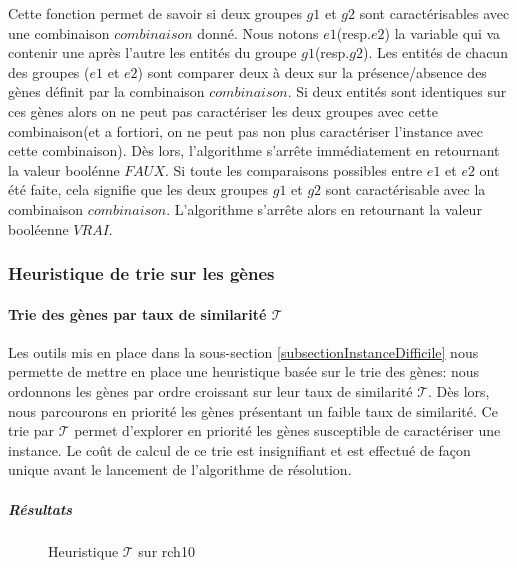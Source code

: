 Cette fonction permet de savoir si deux groupes $g1$ et $g2$ sont caractérisables avec une combinaison $combinaison$ donné. Nous notons $e1$(resp.$e2$) la variable qui va contenir une après l'autre les entités du groupe $g1$(resp.$g2$). Les entités de chacun des groupes ($e1$ et $e2$) sont comparer deux à deux sur la présence/absence des gènes définit par la combinaison $combinaison$. Si deux entités sont identiques sur ces gènes alors on ne peut pas caractériser les deux groupes avec cette combinaison(et a fortiori, on ne peut pas non plus caractériser l'instance avec cette combinaison). Dès lors, l'algorithme s'arrête immédiatement en retournant la valeur boolénne $FAUX$. Si toute les comparaisons possibles entre $e1$ et $e2$ ont été faite, cela signifie que les deux groupes $g1$ et $g2$ sont caractérisable avec la combinaison $combinaison$. L'algorithme s'arrête alors en retournant la valeur booléenne $VRAI$.



\subsubsection{Heuristique de trie sur les gènes }
\paragraph{Trie des gènes par taux de similarité $\mathcal{T}$}
Les outils mis en place dans la sous-section \ref{subsectionInstanceDifficile} nous permette de mettre en place une heuristique basée sur le trie des gènes: nous ordonnons les gènes par ordre croissant sur leur taux de similarité $\mathcal{T}$. Dès lors, nous parcourons en priorité les gènes présentant un faible taux de similarité. Ce trie par $\mathcal{T}$ permet d'explorer en priorité les gènes susceptible de caractériser une instance. Le coût de calcul de ce trie est insignifiant et est effectué de façon unique avant le lancement de l'algorithme de résolution.

\subparagraph{Résultats}

\begin{figure}
\centering
	\begin{minipage}[c]{0.49\linewidth}
	\centering
	
	\end{minipage}
	\begin{minipage}[c]{0.49\linewidth}
	\centering
	
	\end{minipage}
\caption{Heuristique $\mathcal{T}$ sur rch10}
\label{tauRch10}
\end{figure}

